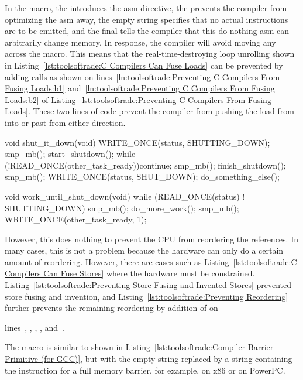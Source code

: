 In the  macro, the  introduces the asm
directive, the  prevents the compiler from optimizing
the asm away, the empty string specifies that no actual instructions
are to be emitted, and the final  tells the compiler that
this do-nothing asm can arbitrarily change memory.
In response, the compiler will avoid moving any
 across
the  macro.
This means that the real-time-destroying loop unrolling shown in
Listing~\ref{lst:toolsoftrade:C Compilers Can Fuse Loads}
can be prevented by adding  calls as shown on
lines~\ref{ln:toolsoftrade:Preventing C Compilers From Fusing Loads:b1}
and~\ref{ln:toolsoftrade:Preventing C Compilers From Fusing Loads:b2}
of
Listing~\ref{lst:toolsoftrade:Preventing C Compilers From Fusing Loads}.
These two lines of code prevent the compiler from pushing the load from
 into or past  from either
direction.

\begin{listing}[tbp]
\begin{fcvlabel}
\begin{VerbatimL}[commandchars=\\\[\]]
void shut_it_down(void)
{
	WRITE_ONCE(status, SHUTTING_DOWN);
	smp_mb(); \lnlbl[mb1]
	start_shutdown();
	while (!READ_ONCE(other_task_ready))\lnlbl[loop:b]
		continue;
	smp_mb(); \lnlbl[mb2]
	finish_shutdown();
	smp_mb(); \lnlbl[mb3]
	WRITE_ONCE(status, SHUT_DOWN);
	do_something_else();
}

void work_until_shut_down(void)
{
	while (READ_ONCE(status) != SHUTTING_DOWN) {
		smp_mb(); \lnlbl[mb4]
		do_more_work();
	}
	smp_mb(); \lnlbl[mb5]
	WRITE_ONCE(other_task_ready, 1);
}
\end{VerbatimL}
\end{fcvlabel}
\caption{Preventing Reordering}
\label{lst:toolsoftrade:Preventing Reordering}
\end{listing}

However, this does nothing to prevent the CPU from reordering the
references.
In many cases, this is not a problem because the hardware can only do
a certain amount of reordering.
However, there are cases such as
Listing~\ref{lst:toolsoftrade:C Compilers Can Fuse Stores} where the
hardware must be constrained.
Listing~\ref{lst:toolsoftrade:Preventing Store Fusing and Invented Stores}
prevented store fusing and invention, and
Listing~\ref{lst:toolsoftrade:Preventing Reordering}
further prevents the remaining reordering by addition of
 on
\begin{fcvref}
lines~, , , ,
and~.
\end{fcvref}
The  macro is similar to  shown in
Listing~\ref{lst:toolsoftrade:Compiler Barrier Primitive (for GCC)},
but with the empty string replaced by a string containing the
instruction for a full memory barrier, for example, 
on x86 or  on PowerPC.

